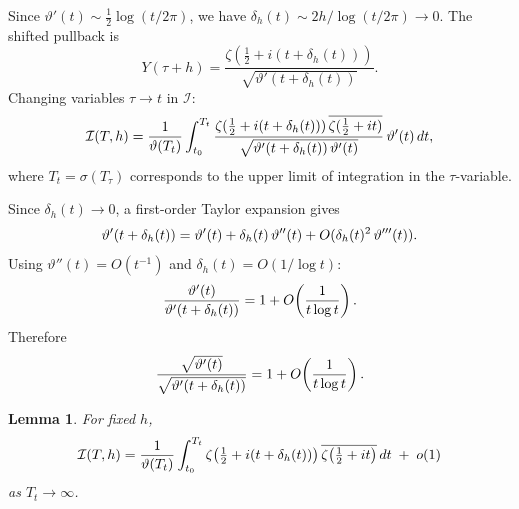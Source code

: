 \documentclass{article}
\newtheorem{lemma}{Lemma}
\begin{document}
Since $\vartheta' (t) \sim \frac{1}{2} \log (t / 2 \pi)$, we have $\delta_h
(t) \sim 2 h / \log (t / 2 \pi) \to 0$. The shifted pullback is
\[ Y (\tau + h) = \frac{\zeta (\tfrac{1}{2} + i (t + \delta_h
   (t)))}{\sqrt{\vartheta'  (t + \delta_h (t))}} . \]
Changing variables $\tau \to t$ in $\mathcal{I}$:
\begin{equation}
  \label{eq:I-height} \mathcal{I} (T, h) = \frac{1}{\vartheta (T_t)} 
  \int_{t_0}^{T_t} \frac{\zeta (\tfrac{1}{2} + i (t + \delta_h (t)))
  \hspace{0.17em} \overline{\zeta (\tfrac{1}{2} + it)}}{\sqrt{\vartheta'  (t +
  \delta_h (t))  \hspace{0.17em} \vartheta' (t)}}  \hspace{0.17em} \vartheta'
  (t)  \hspace{0.17em} dt,
\end{equation}
where $T_t = \sigma (T_{\tau})$ corresponds to the upper limit of integration
in the $\tau$-variable.

Since $\delta_h (t) \to 0$, a first-order Taylor expansion gives
\[ \vartheta'  (t + \delta_h (t)) = \vartheta' (t) + \delta_h (t) 
   \hspace{0.17em} \vartheta'' (t) + O (\delta_h (t)^2  \hspace{0.17em}
   \vartheta''' (t)) . \]
Using $\vartheta'' (t) = O (t^{- 1})$ and $\delta_h (t) = O (1 / \log t)$:
\[ \frac{\vartheta' (t)}{\vartheta'  (t + \delta_h (t))} = 1 + O
   \hspace{-0.17em} \left( \frac{1}{t \log t} \right) . \]
Therefore
\[ \frac{\sqrt{\vartheta' (t)}}{\sqrt{\vartheta'  (t + \delta_h (t))}} = 1 + O
   \hspace{-0.17em} \left( \frac{1}{t \log t} \right) . \]
\begin{lemma}
  \label{lem:jacobian-simplify}For fixed $h$,
  \[ \mathcal{I} (T, h) = \frac{1}{\vartheta (T_t)}  \int_{t_0}^{T_t} \zeta
     \hspace{-0.17em} \left( \tfrac{1}{2} + i (t + \delta_h (t)) \right)
     \overline{\zeta \hspace{-0.17em} \left( \tfrac{1}{2} + it \right)}
     \hspace{0.17em} dt \hspace{0.27em} + \hspace{0.27em} o (1) \]
  as $T_t \to \infty$.
\end{lemma}
\end{document}
